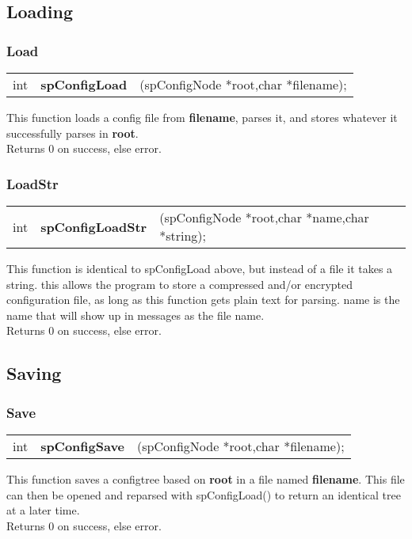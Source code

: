 \documentclass[10pt]{article}
\begin{document}
\subsection{Loading}


\subsubsection*{Load}
\noindent\begin{tabular}{l l l @{}}
int&\textbf{spConfigLoad}&(spConfigNode *root,char *filename);\\
\end{tabular}

\noindent This function loads a config file from \textbf{filename}, parses it,
and stores whatever it successfully parses in \textbf{root}.\\  Returns 0 on
success, else error.

\subsubsection*{LoadStr}
\noindent\begin{tabular}{l l l @{}}
int&\textbf{spConfigLoadStr}&(spConfigNode *root,char *name,char *string);\\
\end{tabular}

\noindent This function is identical to spConfigLoad above, but instead of a
file it takes a string.  this allows the program to store a compressed and/or
encrypted configuration file, as long as this function gets plain text for
parsing. name is the name that will show up in messages as the file name.\\
Returns 0 on success, else error.



\subsection{Saving}

\subsubsection*{Save}
\noindent\begin{tabular}{l l l @{}}
int&\textbf{spConfigSave}&(spConfigNode *root,char *filename);\\
\end{tabular}

\noindent This function saves a configtree based on \textbf{root} in a file
named \textbf{filename}. This file can then be opened and reparsed with
spConfigLoad() to return an identical tree at a later time.\\ Returns 0 on
success, else error.
\end{document}
